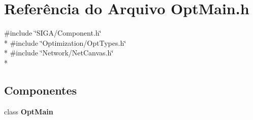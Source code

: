 \section{Referência do Arquivo Opt\+Main.\+h}
\label{_opt_main_8h}
{\ttfamily \#include \char`\"{}S\+I\+G\+A/\+Component.\+h\char`\"{}}\\*
{\ttfamily \#include \char`\"{}Optimization/\+Opt\+Types.\+h\char`\"{}}\\*
{\ttfamily \#include \char`\"{}Network/\+Net\+Canvas.\+h\char`\"{}}\\*
\subsection*{Componentes}
\begin{DoxyCompactItemize}
\item 
class {\bf Opt\+Main}
\end{DoxyCompactItemize}

